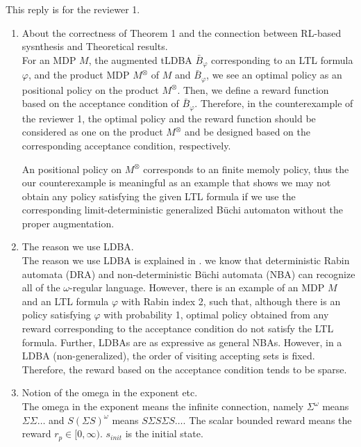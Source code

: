 \documentclass[10 pt, dvipdfmx]{article}
\theoremstyle{definition}
\begin{document}
This reply is for the reviewer 1.

\begin{enumerate}
  \item About the correctness of Theorem 1 and the connection between RL-based sysnthesis and Theoretical results. \\
  For an MDP $M$, the augmented tLDBA $\bar{B}_{\varphi}$ corresponding to an LTL formula $\varphi$, and the product MDP $M^{\otimes}$ of $M$ and $\bar{B}_{\varphi}$, we see an optimal policy as an positional policy on the product $M^{\otimes}$. Then, we define a reward function based on the acceptance condition of $\bar{B}_{\varphi}$. Therefore, in the counterexample of the reviewer 1, the optimal policy and the reward function should be considered as one on the product $M^{\otimes}$ and be designed based on the corresponding acceptance condition, respectively.

  An positional policy on $M^{\otimes}$ corresponds to an finite memoly policy, thus the our counterexample is meaningful as an example that shows we may not obtain any policy satisfying the given LTL formula if we use the corresponding limit-deterministic generalized B\"{u}chi automaton without the proper augmentation.

  \item The reason we use LDBA. \\
  The reason we use LDBA is explained in \cite{Hahn2019}. we know that deterministic Rabin automata (DRA) and non-deterministic B\"{u}chi automata (NBA) can recognize all of the $\omega$-regular language. However, there is an example of an MDP $M$ and an LTL formula $\varphi$ with Rabin index 2, such that, although there is an policy satisfying $\varphi$ with probability 1, optimal policy obtained from any reward corresponding to the acceptance condition do not satisfy the LTL formula. Further, LDBAs are as expressive as general NBAs.
  However, in a LDBA (non-generalized), the order of visiting accepting sets is fixed. Therefore, the reward based on the acceptance condition tends to be sparse.

  \item Notion of the omega in the exponent etc. \\
  The omega in the exponent means the infinite connection, namely $\Sigma^{\omega}$ means $\Sigma \Sigma \ldots$ and $S (\Sigma S)^{\omega}$ means $S \Sigma S \Sigma S \ldots$. The scalar bounded reward means the reward $r_p \in [0,\infty)$. $s_{init}$ is the initial state.


\end{enumerate}
\end{document}
